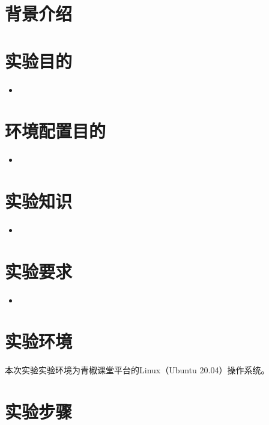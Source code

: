 \documentclass {article}
\begin{document}
	\maketitle{}
	\section{背景介绍}
	
	\section{实验目的}
		\begin{itemize}
			\item 
		\end{itemize}
	
	\section{环境配置目的}
		\begin{itemize}
			\item 
		\end{itemize}
	
	\section{实验知识}	
		\begin{itemize}
			\item 
		\end{itemize}
	
	\section{实验要求}
		\begin{itemize}
			\item 
		\end{itemize}
	
	\section{实验环境}
		本次实验实验环境为青椒课堂平台的Linux（Ubuntu 20.04）操作系统。
	
	\section{实验步骤}
	
\end{document}

